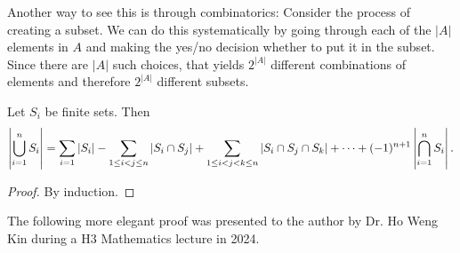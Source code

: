 Another way to see this is through combinatorics: Consider the process of creating a subset. We can do this systematically by going through each of the $|A|$ elements in $A$ and making the yes/no decision whether to put it in the subset. Since there are $|A|$ such choices, that yields $2^{|A|}$ different combinations of elements and therefore $2^{|A|}$ different subsets.


\begin{theorem}
Let $S_i$ be finite sets. Then
\begin{equation}
\left|\bigcup_{i=1}^nS_i\right|=\sum_{i=1}|S_i|-\sum_{1\le i<j\le n}|S_i\cap S_j|+\sum_{1\le i<j<k\le n}|S_i\cap S_j\cap S_k|+\cdots+(-1)^{n+1}\left|\bigcap_{i=1}^nS_i\right|.
\end{equation}
\end{theorem}

\begin{proof}
By induction.
\end{proof}

The following more elegant proof was presented to the author by Dr. Ho Weng Kin during a H3 Mathematics lecture in 2024.

